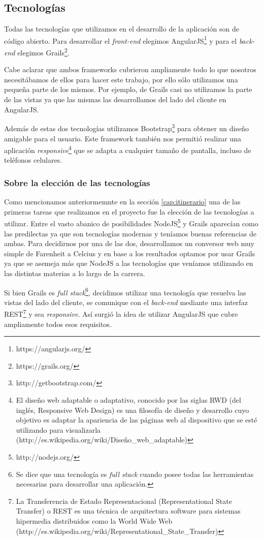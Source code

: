 \subsection{Tecnologías}
Todas las tecnologías que utilizamos en el desarrollo de la aplicación son de código abierto. Para desarrollar el \textit{front-end} elegimos AngularJS\footnote{https://angularjs.org/} y para el \textit{back-end} elegimos Grails\footnote{https://grails.org/}.

Cabe aclarar que ambos frameworks cubrieron ampliamente todo lo que nosotros necesitábamos de ellos para hacer este trabajo, por ello sólo utilizamos una pequeña parte de los mismos. Por ejemplo, de Grails casi no utilizamos la parte de las vistas ya que las mismas las desarrollamos del lado del cliente en AngularJS.

Además de estas dos tecnologías utilizamos Bootstrap\footnote{http://getbootstrap.com/} para obtener un diseño amigable para el usuario. Este framework también nos permitió realizar una aplicación \textit{responsive}\footnote{El diseño web adaptable o adaptativo, conocido por las siglas RWD (del inglés, Responsive Web Design) es una filosofía de diseño y desarrollo cuyo objetivo es adaptar la apariencia de las páginas web al dispositivo que se esté utilizando para visualizarla (http://es.wikipedia.org/wiki/Diseño\_web\_adaptable)} que se adapta a cualquier tamaño de pantalla, incluso de teléfonos celulares.

\subsubsection{Sobre la elección de las tecnologías}\label{cap:eleccion_tecnologias}
Como mencionamos anteriormemnte en la sección \ref{cap:itinerario} una de las primeras tareas que realizamos en el proyecto fue la elección de las tecnologías a utilizar. Entre el vasto abanico de posibilidades NodeJS\footnote{http://nodejs.org/} y Grails aparecían como las predilectas ya que son tecnologías modernas y teníamos buenas referencias de ambas. Para decidirnos por una de las dos, desarrollamos un conversor web muy simple de Farenheit a Celcius y en base a los resultados optamos por usar Grails ya que se asemeja más que NodeJS a las tecnologías que veníamos utilizando en las distintas materias a lo largo de la carrera.

Si bien Grails es \textit{full stack}\footnote{Se dice que una tecnología es \textit{full stack} cuando posee todas las herramientas necesarias para desarrollar una aplicación.}, decidimos utilizar una tecnología que resuelva las vistas del lado del cliente, se comunique con el \textit{back-end} mediante una interfaz REST\footnote{La Transferencia de Estado Representacional (Representational State Transfer) o REST es una técnica de arquitectura software para sistemas hipermedia distribuidos como la World Wide Web (http://es.wikipedia.org/wiki/Representational\_State\_Transfer)} 
y sea \textit{responsive}. Así surgió la idea de utilizar AngularJS que cubre ampliamente todos esos requisitos.

